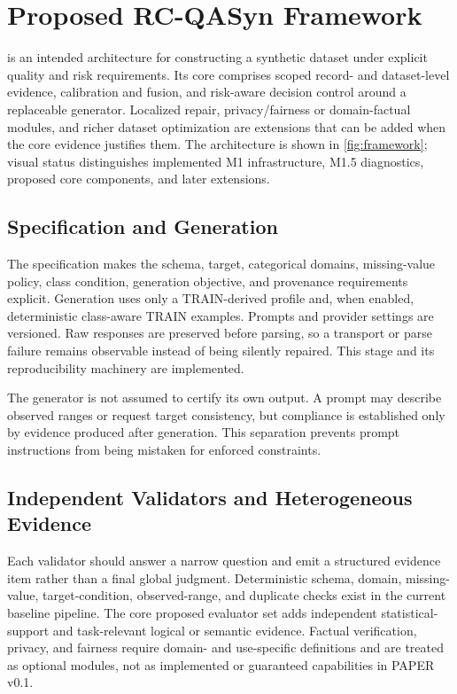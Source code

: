\section{Proposed RC-QASyn Framework}
\label{sec:method}

\rcqasyn{} is an intended architecture for constructing a synthetic dataset
under explicit quality and risk requirements. Its core comprises scoped
record- and dataset-level evidence, calibration and fusion, and risk-aware
decision control around a replaceable generator. Localized repair,
privacy/fairness or domain-factual modules, and richer dataset optimization are
extensions that can be added when the core evidence justifies them. The
architecture is shown in \cref{fig:framework}; visual status distinguishes
implemented M1 infrastructure, M1.5 diagnostics, proposed core components, and
later extensions.



\subsection{Specification and Generation}

The specification makes the schema, target, categorical domains,
missing-value policy, class condition, generation objective, and provenance
requirements explicit. Generation uses only a TRAIN-derived profile and,
when enabled, deterministic class-aware TRAIN examples. Prompts and provider
settings are versioned. Raw responses are preserved before parsing, so a
transport or parse failure remains observable instead of being silently
repaired. This stage and its reproducibility machinery are implemented.

The generator is not assumed to certify its own output. A prompt may describe
observed ranges or request target consistency, but compliance is established
only by evidence produced after generation. This separation prevents prompt
instructions from being mistaken for enforced constraints.

\subsection{Independent Validators and Heterogeneous Evidence}

Each validator should answer a narrow question and emit a structured evidence
item rather than a final global judgment. Deterministic schema, domain,
missing-value, target-condition, observed-range, and duplicate checks exist in
the current baseline pipeline. The core proposed evaluator set adds
independent statistical-support and task-relevant logical or semantic
evidence. Factual verification, privacy, and fairness require domain- and
use-specific definitions and are treated as optional modules, not as
implemented or guaranteed capabilities in PAPER v0.1.

